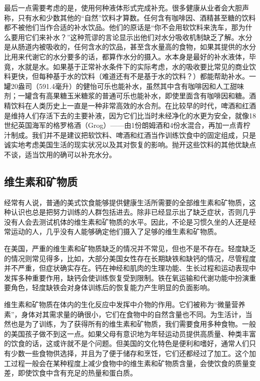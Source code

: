 最后一点需要考虑的是，使用何种液体形式完成补充。很多健康从业者会大胆声称，只有水和少数其他的“自然”饮料才算数。任何含有咖啡因、酒精甚至糖的饮料都不被他们当作合适的补水饮品。他们的原话是“你不会用软饮料来洗车，那为什么要用它们来补水？”这种荒谬的言论显示出他们对水分吸收机制缺乏了解。水分是从肠道内被吸收的，任何含水的饮品，甚至含水量高的食物，如果其提供的水分比用来代谢它的水分要多的话，都算作水分的摄入。水本身是最好的补水液体，毕竟，水就是水。如果基于正常补水条件下的实际考虑，水的吸收要比常见的商业饮料更快，但每种基于水的饮料（难道还有不是基于水的饮料？）都能帮助补水。一罐20盎司（591.4毫升）的健怡可乐也能补水，虽然其中含有咖啡因和人工甜味剂；一罐含有高果糖玉米糖浆的普通可乐也能补水，即使里面含有咖啡因和糖。酒精饮料在人类历史上一直是一种非常高效的水合剂。在比较早的时代，啤酒和红酒是维持人们存活下去的主要补液，因为它们比当时未经净化的水更为安全，就像18世纪英国海军的格罗格酒（Grog）——由1份朗姆酒和4份水混合，再加一点青柠汁制成。我们并不是建议把软饮料、啤酒和红酒当作训练饮食中的固定组成，只是诚实地考虑美国生活的现实状况以及其对恢复的影响。抛开这些饮料的其他优缺点不谈，适当饮用的确可以补充水分。

\subsection{维生素和矿物质}

经常有人说，普通的美式饮食能够提供健康生活所需要的全部维生素和矿物质，这种认识也总是把努力训练的人群包括进去。除非已经显示出了缺乏症状，否则几乎没有人会去测试机体的维生素和矿物质的水平。因此，不论是习惯久坐的人还是经常运动的人，几乎没有人能够确定他们摄入了足够的维生素和矿物质。

在美国，严重的维生素和矿物质缺乏的情况并不常见，但也不是不存在。轻度缺乏的情况则常见得多，比如，大部分美国女性存在长期缺铁和缺钙的情况，尽管程度并不严重，但症状确实存在。钙在神经和肌肉的生理功能、生长过程和运动表现中发挥多种重要作用，缺钙会使训练恢复受到限制。铁在氧运输和代谢功能中扮演重要角色，轻度缺铁会对身体训练后的恢复能力产生明显的负面影响。

维生素和矿物质在体内的生化反应中发挥中介物的作用。它们被称为“微量营养素”，身体对其需求量的确很小，它们在食物中的自然含量也不同。为生活计，当然也是为了训练，为了获得所有的维生素和矿物质，我们需要食用多种食物。一般的美国孩子做不到这一点。如果父母有意识地为年轻运动员提供高质量、种类丰富的饮食的话，这或许就不是个问题。但美国的文化特色是便利和嗜好，通常人们只有少数一些食物供选择，并且为了便于储存和烹饪，它们还都经过了加工。这个加工过程一般会在某种程度上减少食物中的维生素和矿物质含量，会使饮食的质量变差，即使饮食中含有充足的热量和蛋白质。

